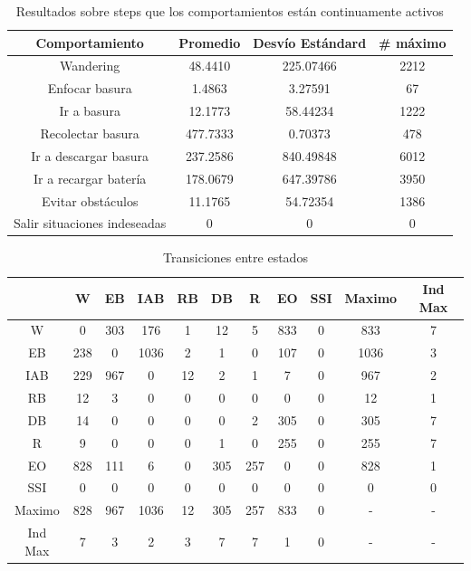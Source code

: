 \begin{table}[ht]
	\begin{center}
		\begin{tabular}{|c|c|c|c|}
			\hline
			Comportamiento & Promedio & Desv\'io Est\'andard & \# m\'aximo \\
			\hline
			Wandering & 48.4410 & 225.07466 & 2212 \\
			Enfocar basura & 1.4863 & 3.27591 & 67 \\
			Ir a basura & 12.1773 & 58.44234 & 1222 \\
			Recolectar basura & 477.7333 & 0.70373 & 478 \\
			Ir a descargar basura & 237.2586 & 840.49848 & 6012 \\
			Ir a recargar bater\'ia & 178.0679 & 647.39786 & 3950 \\
			Evitar obst\'aculos & 11.1765 & 54.72354 & 1386 \\
			Salir situaciones indeseadas & 0 & 0 & 0 \\
			\hline
		\end{tabular}
	\end{center}
	\caption{Resultados sobre steps que los comportamientos est\'an continuamente activos}
	\label{behaviours_stats1}
\end{table}

\begin{table}
	\begin{center}
		\begin{tabular}{|c||c|c|c|c|c|c|c|c||c|c|}
		\hline
    	 & W & EB & IAB & RB & DB & R & EO & SSI & Maximo & Ind Max \\
		\hline
		\hline
			W &     0&    303&    176&      1&     12&      5&    833&      0&    833&      7\\
		\hline
			EB &   238&      0&   1036&      2&      1&      0&    107&      0&   1036&      3\\
		\hline
			IAB &    229&    967&      0&     12&      2&      1&      7&      0&    967&      2\\
		\hline
			RB &     12&      3&      0&      0&      0&      0&      0&      0&     12&      1\\
		\hline
			DB &     14&      0&      0&      0&      0&      2&    305&      0&    305&      7\\
		\hline
			R &      9&      0&      0&      0&      1&      0&    255&      0&    255&      7\\
		\hline
			EO &    828&    111&      6&      0&    305&    257&      0&      0&    828&      1\\
		\hline
			SSI &      0&      0&      0&      0&      0&      0&      0&      0&      0&      0\\
		\hline
		\noalign{\smallskip}
		\hline
			Maximo &    828&    967&   1036&     12&    305&    257&    833&      0&      -&      -\\
		\hline
			Ind Max &      7&      3&      2&      3&      7&      7&      1&      0&      -&      -\\
		\hline
		\end{tabular}
	\end{center}
	\caption{Transiciones entre estados}
	\label{transitions}
\end{table}

